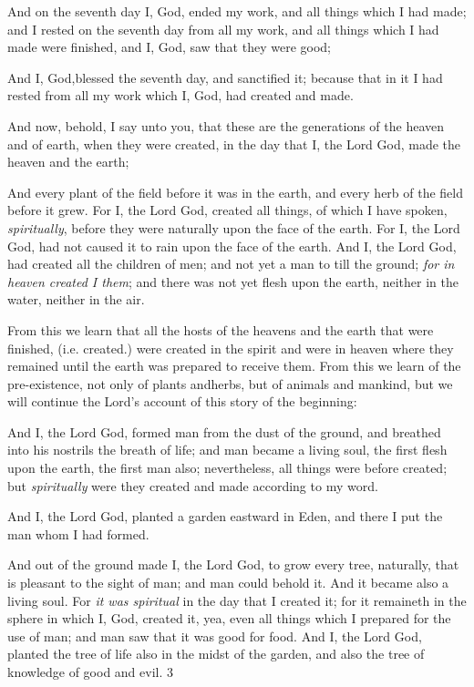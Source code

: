 And on the seventh day I, God, ended my work, and all things which I had made; and I rested
on the seventh day from all my work, and all things which I had made were finished, and I,
God, saw that they were good;

And I, God,blessed the seventh day, and sanctified it; because that in it I had rested from all
my work which I, God, had created and made.

And now, behold, I say unto you, that these are the generations of the heaven and of earth,
when they were created, in the day that I, the Lord God, made the heaven and the earth;

And every plant of the field before it was in the earth, and every herb of the field before it
grew. For I, the Lord God, created all things, of which I have spoken, \textit{spiritually}, before they
were naturally upon the face of the earth. For I, the Lord God, had not caused it to rain upon
the face of the earth. And I, the Lord God, had created all the children of men; and not yet a
man to till the ground; \textit{for in heaven created I them}; and there was not yet flesh upon the
earth, neither in the water, neither in the air.

From this we learn that all the hosts of the heavens and the earth that were finished, (i.e.
created.) were created in the spirit and were in heaven where they remained until the earth
was prepared to receive them. From this we learn of the pre-existence, not only of plants andherbs, but of animals and mankind, but we will continue the Lord's account of this story of
the beginning:

And I, the Lord God, formed man from the dust of the ground, and breathed into his nostrils
the breath of life; and man became a living soul, the first flesh upon the earth, the first man
also; nevertheless, all things were before created; but \textit{spiritually} were they created and made
according to my word.

And I, the Lord God, planted a garden eastward in Eden, and there I put the man whom I had
formed.

And out of the ground made I, the Lord God, to grow every tree, naturally, that is pleasant to
the sight of man; and man could behold it. And it became also a living soul. For \textit{it was
spiritual} in the day that I created it; for it remaineth in the sphere in which I, God, created it,
yea, even all things which I prepared for the use of man; and man saw that it was good for
food. And I, the Lord God, planted the tree of life also in the midst of the garden, and also the
tree of knowledge of good and evil. 3

